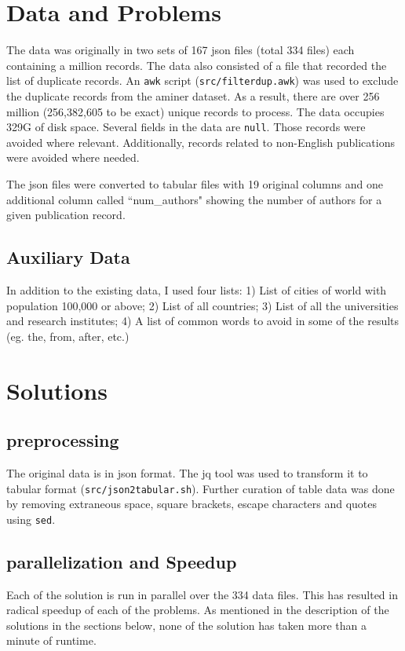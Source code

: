 \documentclass{report}
\begin{document}
\section*{Data and Problems}
The data was originally in two sets of 167 json files (total 334 files) each
containing a million records. The data also consisted of a file that recorded
the list of duplicate records. An \texttt{awk} script (\texttt{src/filterdup.awk}) was used to exclude the
duplicate records from the aminer dataset. As a result, there are over 256
million (256,382,605 to be exact) unique records to process. The data occupies
329G of disk space. Several fields in the data are \texttt{null}. Those records
were avoided where relevant. Additionally, records related to non-English
publications were avoided where needed.

The json files were converted to tabular files with 19 original columns and one
additional column called ``num\_authors" showing the number of authors for a given
publication record.

\subsection*{Auxiliary Data}
In addition to the existing data, I used four lists: 1) List of cities of
world with population 100,000 or above; 2) List of all countries;
3) List of all the universities and research institutes; 4) A list of common
words to avoid in some of the results (eg. the, from, after, etc.)

\section*{Solutions}
\subsection*{preprocessing}
The original data is in json format. The jq tool was used to transform it to
tabular format (\texttt{src/json2tabular.sh}). Further curation of table data
was done by removing extraneous space, square brackets, escape characters and
quotes using \texttt{sed}.

\subsection*{parallelization and Speedup}
Each of the solution is run in parallel over the 334 data files. This has
resulted in radical speedup of each of the problems. As mentioned in the
description of the solutions in the sections below, none of the solution has
taken more than a minute of runtime.
\end{document}
